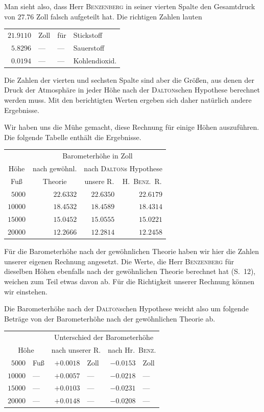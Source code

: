Man sieht also, dass Herr \textsc{Benzenberg} in seiner vierten Spalte den Gesamtdruck von $27.76$ Zoll falsch aufgeteilt hat. Die richtigen Zahlen lauten
\begin{center}\begin{tabular}{rlll}
$21.9110$ & Zoll & für & Stickstoff\\
$5.8296$ & — & — & Sauerstoff\\
$0.0194$ & — & — & Kohlendioxid.
\end{tabular}\end{center}
Die Zahlen der vierten und sechsten Spalte sind aber die Größen, aus denen der Druck der Atmosphäre in jeder Höhe nach der \textsc{Dalton}schen Hypothese berechnet werden muss. Mit den berichtigten Werten ergeben sich daher natürlich andere Ergebnisse.

Wir haben uns die Mühe gemacht, diese Rechnung für einige Höhen auszuführen. Die folgende Tabelle enthält die Ergebnisse.
\begin{center}\begin{tabular}{r|r|r|r}
& \multicolumn{3}{c}{Barometerhöhe in Zoll}\\
\multicolumn{1}{c|}{Höhe} & \multicolumn{1}{c|}{nach gewöhnl.} & \multicolumn{2}{c}{nach \textsc{Dalton}s Hypothese}\\
\multicolumn{1}{c|}{Fuß} & \multicolumn{1}{c|}{Theorie} & \multicolumn{1}{c|}{unsere R.} & \multicolumn{1}{c}{H.\ \textsc{Benz}.\ R.}\\\hline
$5000$ & $22.6332$ & $22.6350$ & $22.6179$\\
$10000$ & $18.4532$ & $18.4589$ & $18.4314$\\
$15000$ & $15.0452$ & $15.0555$ & $15.0221$\\
$20000$ & $12.2666$ & $12.2814$ & $12.2458$
\end{tabular}\end{center}

Für die Barometerhöhe nach der gewöhnlichen Theorie haben wir hier die Zahlen unserer eigenen Rechnung angesetzt. Die Werte, die Herr \textsc{Benzenberg} für dieselben Höhen ebenfalls nach der gewöhnlichen Theorie berechnet hat (S.\ 12), weichen zum Teil etwas davon ab. Für die Richtigkeit unserer Rechnung können wir einstehen.

Die Barometerhöhe nach der \textsc{Dalton}schen Hypothese weicht also um folgende Beträge von der Barometerhöhe nach der gewöhnlichen Theorie ab.
\begin{center}\begin{tabular}{rl|rl|rl}
& & \multicolumn{4}{c}{Unterschied der Barometerhöhe}\\
\multicolumn{2}{c|}{Höhe} & \multicolumn{2}{c|}{nach unserer R.} & \multicolumn{2}{c}{nach Hr.\ \textsc{Benz}.}\\\hline
$5000$ & Fuß & $+0.0018$ & Zoll & $-0.0153$ & Zoll\\
$10000$ & — & $+0.0057$ & — & $-0.0218$ & —\\
$15000$ & — & $+0.0103$ & — & $-0.0231$ & —\\
$20000$ & — & $+0.0148$ & — & $-0.0208$ & —
\end{tabular}\end{center}

